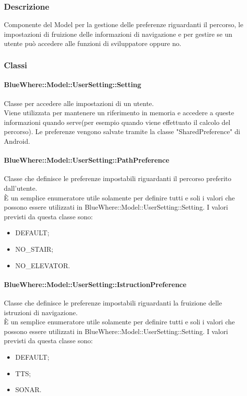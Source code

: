 \documentclass[../SpecificaTecnica.tex]{subfiles}
\begin{document}
		\subsubsection{Descrizione}
			Componente del Model per la gestione delle preferenze riguardanti il percorso, le impostazioni di fruizione delle informazioni di navigazione e per gestire se un utente può accedere alle funzioni di sviluppatore oppure no.
		\subsubsection{Classi}
			\paragraph{BlueWhere::Model::UserSetting::Setting}
				Classe per accedere alle impostazioni di un utente. \\
				Viene utilizzata per mantenere un riferimento in memoria e accedere a queste informazioni quando serve(per esempio quando viene effettuato il calcolo del percorso). Le preferenze vengono salvate tramite la classe "SharedPreference" di Android.
			\paragraph{BlueWhere::Model::UserSetting::PathPreference}
				Classe che definisce le preferenze impostabili riguardanti il percorso preferito dall'utente. \\
				È un semplice enumeratore utile solamente per definire tutti e soli i valori che possono essere utilizzati in BlueWhere::Model::UserSetting::Setting.
				I valori previsti da questa classe sono:
				\begin{itemize}
					\item DEFAULT;
					\item NO\_STAIR;
					\item NO\_ELEVATOR.
				\end{itemize}
			\paragraph{BlueWhere::Model::UserSetting::IstructionPreference}
				Classe che definisce le preferenze impostabili riguardanti la fruizione delle istruzioni di navigazione. \\
				È un semplice enumeratore utile solamente per definire tutti e soli i valori che possono essere utilizzati in BlueWhere::Model::UserSetting::Setting.
				I valori previsti da questa classe sono:
				\begin{itemize}
					\item DEFAULT;
					\item TTS;
					\item SONAR.
				\end{itemize}
\end{document}
